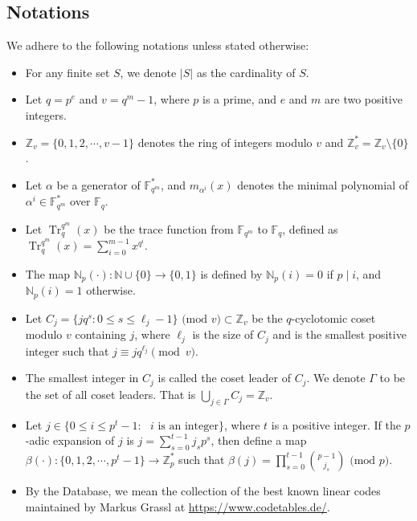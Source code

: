\documentclass[pdflatex,sn-mathphys-num]{sn-jnl}%
\theoremstyle{thmstyleone}%
\theoremstyle{thmstyletwo}%
\theoremstyle{thmstylethree}%
\begin{document}
\subsection{Notations}
We adhere to the following notations unless stated otherwise:
\begin{itemize}
     \item For any finite set $S$, we denote $|S|$ as the cardinality of $S$. 
    \item Let $q=p^e$ and $v=q^{m}-1$, where $p$ is a prime, and $e$ and $m$ are two positive integers. 
    \item $\mathbb{Z}_{v}=\{0,1,2,\cdots,v-1\}$ denotes the ring of integers modulo $v$ and $\mathbb{Z}_{v}^{*}=\mathbb{Z}_{v}\setminus\{0\}$.
    \item Let $\alpha$ be a generator of $\mathbb{F}_{q^m}^{*}$, and $m_{\alpha^{i}}(x)$ denotes the minimal polynomial of $\alpha^i\in\mathbb{F}_{q^m}^{*}$ over $\mathbb{F}_{q}$.  %
    \item Let $\operatorname{Tr}_{q}^{q^m}(x)$ be the trace function from $\mathbb{F}_{q^m}$ to $\mathbb{F}_{q}$, defined as
    $\operatorname{Tr}_{q}^{q^m}(x)=\sum_{i=0}^{m-1}x^{q^i}$.
    \item The map $\mathbb{N}_{p}(\cdot):\mathbb{N}\cup\{0\}\rightarrow\{0,1\}$ is defined by $\mathbb{N}_{p}(i)=0$ if $p\mid i$, and $\mathbb{N}_{p}(i)=1$ otherwise. 
    \item Let $C_{j}=\{jq^{s}:0\leq s\leq \ell_{j}-1\}\text{ (mod $v$)}\subset\mathbb{Z}_{v}$ be the $q$-cyclotomic coset modulo $v$ containing $j$, where $\ell_{j}$ is the size of $C_{j}$ and is the smallest positive integer such that $j\equiv jq^{\ell_{j}}\pmod{v}$. 
    \item  The smallest integer in $C_{j}$ is called the coset leader of $C_{j}$. We denote $\Gamma$ to be the set of all coset leaders. That is $\bigcup_{j\in\Gamma}C_{j}=\mathbb{Z}_{v}$.
    \item Let $j\in\{0\leq i\leq p^t-1:\text{ $i$ is an integer}\}$, where $t$ is a positive integer. If the $p$-adic expansion of $j$ is $j=\sum_{s=0}^{t-1}j_{s}p^{s}$, then define a map $\beta(\cdot):\{0,1,2,\cdots,p^t-1\}\rightarrow\mathbb{Z}_{p}^{*}$ such that $\beta(j)=\prod_{s=0}^{t-1}\binom{p-1}{j_{s}}\text{ (mod $p$)}$.
    \item By the Database, we mean the collection of the best known linear codes maintained by Markus Grassl at \url{https://www.codetables.de/}.
\end{itemize}
\end{document}

